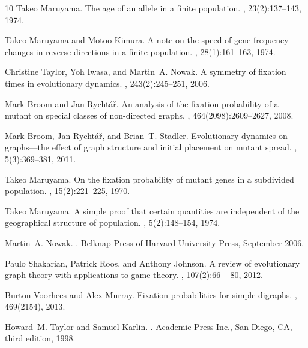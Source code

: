 \documentclass[a4paper,english,10pt]{amsart}
\theoremstyle{definition}
\numberwithin{equation}{section}
\begin{document}
\begin{thebibliography}{10}
Takeo Maruyama.
\newblock The age of an allele in a finite population.
, 23(2):137–143, 1974.

Takeo Maruyama and Motoo Kimura.
\newblock A note on the speed of gene frequency changes in reverse directions
  in a finite population.
, 28(1):161--163, 1974.

Christine Taylor, Yoh Iwasa, and Martin~A. Nowak.
\newblock A symmetry of fixation times in evolutionary dynamics.
, 243(2):245--251, 2006.

Mark Broom and Jan Rycht{\'a}{\v r}.
\newblock An analysis of the fixation probability of a mutant on special
  classes of non-directed graphs.
, 464(2098):2609--2627, 2008.

Mark Broom, Jan Rycht{\'a}{\v{r}}, and Brian~T. Stadler.
\newblock Evolutionary dynamics on graphs---the effect of graph structure and
  initial placement on mutant spread.
, 5(3):369--381, 2011.

Takeo Maruyama.
\newblock On the fixation probability of mutant genes in a subdivided
  population.
, 15(2):221–225, 1970.

Takeo Maruyama.
\newblock A simple proof that certain quantities are independent of the
  geographical structure of population.
, 5(2):148--154, 1974.

Martin~A. Nowak.
.
\newblock Belknap Press of Harvard University Press, September 2006.

Paulo Shakarian, Patrick Roos, and Anthony Johnson.
\newblock A review of evolutionary graph theory with applications to game
  theory.
, 107(2):66 -- 80, 2012.

Burton Voorhees and Alex Murray.
\newblock Fixation probabilities for simple digraphs.
, 469(2154), 2013.

Howard~M. Taylor and Samuel Karlin.
.
\newblock Academic Press Inc., San Diego, CA, third edition, 1998.


\end{thebibliography}
\end{document}

